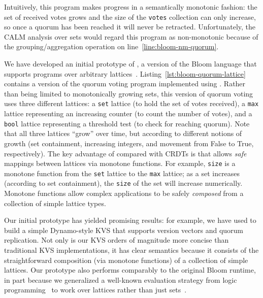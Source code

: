 Intuitively, this program makes progress in a semantically monotonic fashion:
the set of received votes grows and the size of the \texttt{votes} collection
can only increase, so once a quorum has been reached it will never be
retracted. Unfortunately, the CALM analysis over sets would regard this program
as non-monotonic because of the grouping/aggregation operation on
line~\ref{line:bloom-nm-quorum}.

We have developed an initial prototype of \blooml, a version of the Bloom
language that supports programs over arbitrary
lattices~\cite{bloom-lattice-tr}. Listing~\ref{lst:bloom-quorum-lattice}
contains a version of the quorum voting program implemented using
\blooml. Rather than being limited to monotonically growing sets, this version
of quorum voting uses three different lattices: a \texttt{set} lattice (to hold
the set of votes received), a \texttt{max} lattice representing an increasing
counter (to count the number of votes), and a \texttt{bool} lattice representing
a threshold test (to check for reaching quorum). Note that all three lattices
``grow'' over time, but according to different notions of growth (set
containment, increasing integers, and movement from False to True,
respectively). The key advantage of \blooml compared with CRDTs is that \blooml
allows \emph{safe} mappings between lattices via monotone functions. For
example, \texttt{size} is a monotone function from the \texttt{set} lattice to
the \texttt{max} lattice; as a set increases (according to set containment), the
\texttt{size} of the set will increase numerically. Monotone functions allow
complex applications to be safely \emph{composed} from a collection of simple
lattice types.

Our initial \blooml prototype has yielded promising results: for example, we
have used \blooml to build a simple Dynamo-style KVS that supports version
vectors and quorum replication. Not only is our KVS orders of magnitude more
concise than traditional KVS implementations, it has clear semantics because it
consists of the straightforward composition (via monotone functions) of a
collection of simple lattices. Our \blooml prototype also performs comparably to
the original Bloom runtime, in part because we generalized a well-known
evaluation strategy from logic programming~\cite{Balbin1987} to work over
lattices rather than just sets~\cite{bloom-lattice-tr}.

